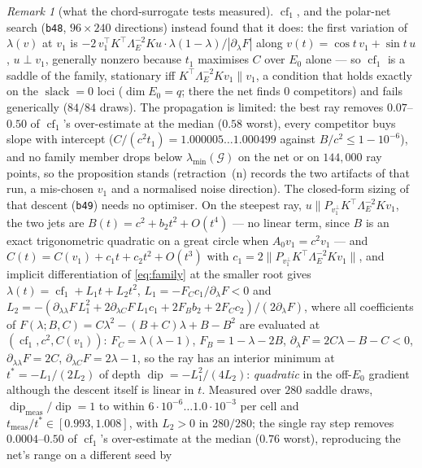\documentclass[11pt]{article}
\theoremstyle{remark}
\newtheorem{remark}{Remark}[section]
\newcommand{\Gr}{\mathcal{G}}
\newcommand{\Le}{\Lambda_E}
\begin{document}
\begin{remark}[what the chord-surrogate tests measured]
$\operatorname{cf}_1$, and the polar-net search (\texttt{b48}, $96\times240$ directions) instead
found that it does: the first variation of $\lambda(v)$ at $v_1$ is
$-2\,v_1^{\top}K^{\top}\Le^{-2}Ku\cdot\lambda(1-\lambda)/|\partial_\lambda F|$ along
$v(t)=\cos t\,v_1+\sin t\,u$, $u\perp v_1$, generally nonzero because $t_1$ maximises $C$ over $E_0$
alone --- so $\operatorname{cf}_1$ is a saddle of the family, stationary iff
$K^{\top}\Le^{-2}Kv_1\parallel v_1$, a condition that holds exactly on the $\operatorname{slack}=0$
loci ($\dim E_0=q$; there the net finds $0$ competitors) and fails generically ($84/84$ draws). The
propagation is limited: the best ray removes $0.07$--$0.50$ of $\operatorname{cf}_1$'s over-estimate at
the median ($0.58$ worst), every competitor buys slope with intercept
($C/(c^{2}t_1)=1.000005\ldots1.000499$ against $B/c^{2}\le1-10^{-6}$), and no family member drops below
$\lambda_{\min}(\Gr)$ on the net or on $144{,}000$ ray points, so the proposition stands
(retraction~(n) records the two artifacts of that run, a mis-chosen $v_1$ and a normalised noise
direction). The closed-form sizing of that descent (\texttt{b49}) needs no optimiser. On the steepest
ray, $u\parallel P_{v_1^{\perp}}K^{\top}\Le^{-2}Kv_1$, the two jets are
$B(t)=c^{2}+b_{2}t^{2}+O(t^{4})$ --- no linear term, since $B$ is an exact trigonometric quadratic on a
great circle when $A_0v_1=c^{2}v_1$ --- and $C(t)=C(v_1)+c_{1}t+c_{2}t^{2}+O(t^{3})$ with
$c_{1}=2\|P_{v_1^{\perp}}K^{\top}\Le^{-2}Kv_1\|$, and implicit differentiation of \eqref{eq:family} at
the smaller root gives $\lambda(t)=\operatorname{cf}_1+L_1t+L_2t^{2}$,
$L_1=-F_Cc_1/\partial_\lambda F<0$ and
$L_2=-(\partial_{\lambda\lambda}F\,L_1^{2}+2\partial_{\lambda C}F\,L_1c_1+2F_Bb_2+2F_Cc_2)/(2\partial_\lambda F)$,
where all coefficients of $F(\lambda;B,C)=C\lambda^{2}-(B+C)\lambda+B-B^{2}$ are evaluated at
$(\operatorname{cf}_1,c^{2},C(v_1))$: $F_C=\lambda(\lambda-1)$, $F_B=1-\lambda-2B$,
$\partial_\lambda F=2C\lambda-B-C<0$, $\partial_{\lambda\lambda}F=2C$, $\partial_{\lambda C}F=2\lambda-1$,
so the ray has an interior minimum at $t^{*}=-L_1/(2L_2)$ of depth
$\operatorname{dip}=-L_1^{2}/(4L_2)$:
\emph{quadratic} in the off-$E_0$ gradient although the descent itself is linear in $t$. Measured over
$280$ saddle draws, $\operatorname{dip}_{\mathrm{meas}}/\operatorname{dip}=1$ to within
$6\cdot10^{-6}\ldots1.0\cdot10^{-3}$ per cell and $t_{\mathrm{meas}}/t^{*}\in[0.993,1.008]$, with
$L_2>0$ in $280/280$; the single ray step removes $0.0004$--$0.50$ of $\operatorname{cf}_1$'s
over-estimate at the median ($0.76$ worst), reproducing the net's range on a different seed by

\end{remark}
\end{document}
